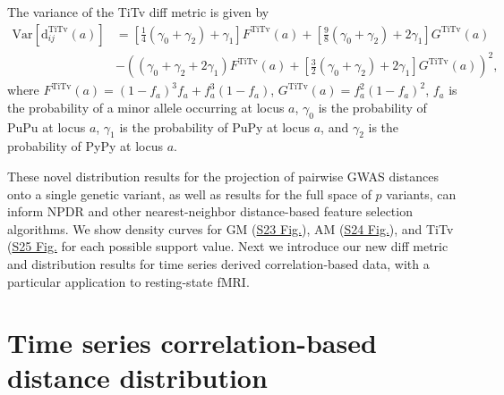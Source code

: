 \documentclass[10pt,letterpaper]{article}
\begin{document}
The variance of the TiTv diff metric is given by
%
\begin{equation}\label{eq:TiTvdiffVar}
\begin{aligned}
\text{Var}\left[\text{d}^\text{TiTv}_{ij}(a)\right] &= \left[\frac{1}{4}(\gamma_0 + \gamma_2) + \gamma_1\right] F^\text{TiTv}(a) + \left[\frac{9}{8}(\gamma_0 + \gamma_2) + 2\gamma_1\right] G^\text{TiTv}(a) \\
&- \left((\gamma_0 + \gamma_2 + 2\gamma_1)F^\text{TiTv}(a) + \left[\frac{3}{2}(\gamma_0 + \gamma_2) + 2\gamma_1\right] G^\text{TiTv}(a)\right)^2,
\end{aligned}
\end{equation}
%
where $F^\text{TiTv}(a) = \left(1 - f_a\right)^3 f_a + f^3_a \left(1 - f_a\right)$, $G^\text{TiTv}(a) = f^2_a \left(1 - f_a\right)^2$, $f_a$ is the probability of a minor allele occurring at locus $a$, $\gamma_0$ is the probability of PuPu at locus $a$, $\gamma_1$ is the probability of PuPy at locus $a$, and $\gamma_2$ is the probability of PyPy at locus $a$.

These novel distribution results for the projection of pairwise GWAS distances onto a single genetic variant, as well as results for the full space of $p$ variants, can inform NPDR and other nearest-neighbor distance-based feature selection algorithms. We show density curves for GM (\hyperlink{S23_Fig}{S23 Fig.}), AM (\hyperlink{S24_Fig}{S24 Fig.}), and TiTv (\hyperlink{S25_Fig}{S25 Fig.} for each possible support value. Next we introduce our new diff metric and distribution results for time series derived correlation-based data, with a particular application to resting-state fMRI.

\section{Time series correlation-based distance distribution}\label{sec:rs-fMRI_distances}
\end{document}
